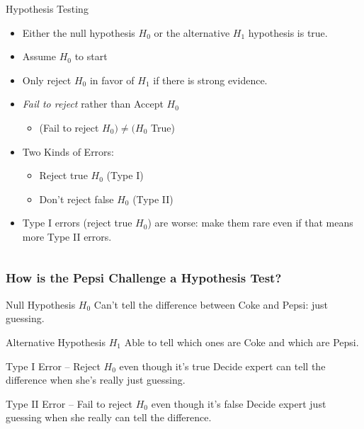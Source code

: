 \begin{frame}
\begin{columns}
\begin{column}{6cm}
\begin{block}{Hypothesis Testing}
		\begin{itemize}
		\item<1-> Either the null hypothesis $H_0$ or the alternative $H_1$  hypothesis is true.
		\item<2-> Assume $H_0$ to start
		\item<3-> Only reject $H_0$ in favor of $H_1$ if there is strong evidence.
		\item<4-> \emph{Fail to reject} rather than Accept $H_0$	
		\begin{itemize} \footnotesize
			\item<5-> (Fail to reject $H_0) \neq (H_0$ True) 
		\end{itemize}
				\item<6-> Two Kinds of Errors:
			\begin{itemize} \footnotesize
				\item<6-> Reject true $H_0$ (Type I)
				\item<6-> Don't reject false $H_0$ (Type II)
			\end{itemize}
			\item<7-> Type I errors (reject true $H_0$) are worse: make them rare even if that means more Type II errors.
	\end{itemize}
\end{block}

\end{column} 
\end{columns} 

\end{frame}
\begin{frame}
\frametitle{How is the Pepsi Challenge a Hypothesis Test?}
	\begin{block}{Null Hypothesis $H_0$}
		Can't tell the difference between Coke and Pepsi: just guessing. \pause
\end{block}
	\begin{block}{Alternative Hypothesis $H_1$}
	Able to tell which ones are Coke and which are Pepsi.\pause
\end{block}
	\begin{block}{Type I Error -- Reject $H_0$ even though it's true} 
	Decide expert can tell the difference when she's really just guessing. \pause
\end{block}
	\begin{block}{Type II Error -- Fail to reject $H_0$ even though it's false}
	Decide expert just guessing when she really can tell the difference. 
\end{block}
\end{frame}
